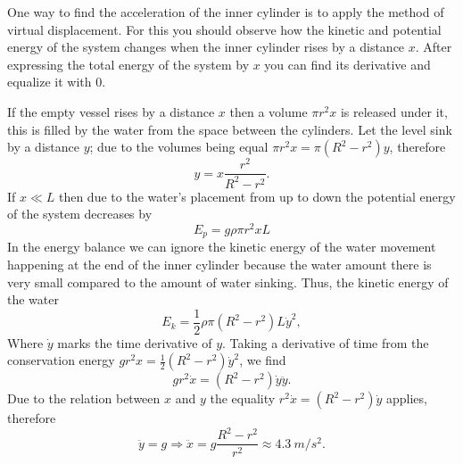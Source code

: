{\ifEngHint
One way to find the acceleration of the inner cylinder is to apply the method of virtual displacement. For this you should observe how the kinetic and potential energy of the system changes when the inner cylinder rises by a distance $x$. After expressing the total energy of the system by $x$ you can find its derivative and equalize it with 0.
\fi


\ifEngSolution
If the empty vessel rises by a distance $x$ then a volume $\pi r^2 x$ is released under it, this is filled by the water from the space between the cylinders. Let the level sink by a distance $y$; due to the volumes being equal $\pi r^2 x = \pi (R^2-r^2) y$, therefore
$$y=x\frac {r^2}{R^2-r^2}.$$
If $x\ll L$ then due to the water’s placement from up to down the potential energy of the system decreases by
$$E_p=g\rho \pi r^2 x L$$ 
In the energy balance we can ignore the kinetic energy of the water movement happening at the end of the inner cylinder because the water amount there is very small compared to the amount of water sinking. Thus, the kinetic energy of the water
$$E_k=\frac 12 \rho \pi (R^2-r^2) L\dot y^2,$$ 
Where $\dot y$ marks the time derivative of $y$. Taking a derivative of time from the conservation energy $gr^2x=\frac 12(R^2-r^2)\dot y^2$, we find
$$gr^2\dot x=(R^2-r^2)\dot y\ddot y.$$ 
Due to the relation between $x$ and $y$ the equality $r^2\dot x=(R^2-r^2)\dot
y$ applies, therefore
$$\ddot y = g\Rightarrow \ddot x = g\frac
{R^2-r^2}{r^2}\approx\SI{4,3}{m/s^2}.$$
\fi
}